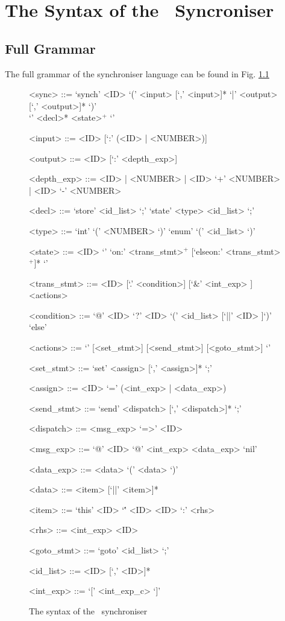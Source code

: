 \chapter{The Syntax of the \ak\ Syncroniser}

  \section{Full Grammar} \label{sync_syntax}
The full grammar of the synchroniser language can be found in Fig. \ref{grammar_sss}
\setlength{\grammarindent}{8em} %
\begin{figure}%
\scriptsize
\begin{grammar}
<sync> ::= `synch' <ID> `(' <input> [`,' <input>]* `|' <output> [`,' <output>]* `)' \\
           `{' <decl>* <state>$^+$ `}'

<input>  ::= <ID> [`:' (<ID> | <NUMBER>)]

<output>  ::= <ID> [`:' <depth\_exp>]

<depth\_exp> ::= <ID> | <NUMBER> | <ID> `+' <NUMBER> | <ID> `-' <NUMBER>

<decl> ::= `store' <id\_list> `;'
        \alt `state' <type> <id\_list> `;'

<type> ::= `int' `(' <NUMBER> `)'
                  \alt `enum' `(' <id\_list> `)'

<state> ::= <ID> `{' `on:' <trans\_stmt>$^+$ [`elseon:' <trans\_stmt>$^+$]* `}'

<trans\_stmt> ::= <ID> [`.' <condition>] [`&' <int\_exp> ] <actions>

<condition> ::= `@' <ID>
             \alt `?' <ID>
             \alt [`?' <ID>] `(' <id\_list> [`||' <ID> ]`)'
             \alt `else'

<actions> ::= `{' [<set\_stmt>] [<send\_stmt>] [<goto\_stmt>] `}'

<set\_stmt> ::= `set' <assign> [`,' <assign>]* `;'

<assign> ::= <ID> `=' (<int\_exp> | <data\_exp>)

<send\_stmt> ::= `send' <dispatch> [`,' <dispatch>]*  `;'

<dispatch> ::= <msg\_exp> `=>' <ID>

<msg\_exp> ::= `@' <ID>
           \alt `@' <int\_exp>
           \alt [`?' <ID>] <data\_exp>
           \alt `nil'

<data\_exp> ::= <data>
             \alt `(' <data> `)'

<data> ::= <item> [`||' <item>]*

<item> ::= `this'
        \alt <ID>
        \alt `\'' <ID>
        \alt <ID> `:' <rhs>

<rhs> ::= <int\_exp>
          \alt <ID>

<goto\_stmt> ::= `goto' <id\_list> `;'

<id\_list> ::= <ID> [`,' <ID>]*

<int\_exp> ::= `[' <int\_exp\_c> `]'
\end{grammar}
\caption{The syntax of the \ak\ synchroniser}
\label{grammar_sss}
\end{figure}

